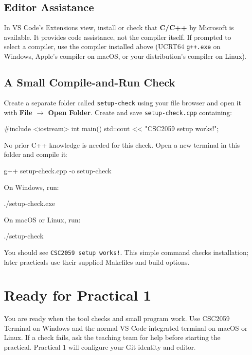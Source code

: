 \documentclass{csc2059practical}
\begin{document}
\subsection{Editor Assistance}
In VS Code's Extensions view, install or check that \textbf{C/C++} by Microsoft is available. It provides code assistance, not the compiler itself. If prompted to select a compiler, use the compiler installed above (UCRT64 \texttt{g++.exe} on Windows, Apple's compiler on macOS, or your distribution's compiler on Linux).

\subsection{A Small Compile-and-Run Check}
Create a separate folder called \texttt{setup-check} using your file browser and open it with \textbf{File $\rightarrow$ Open Folder}. Create and save \texttt{setup-check.cpp} containing:
\begin{cppcode}
#include <iostream>
int main()
{
    std::cout << "CSC2059 setup works!\n";
}
\end{cppcode}
No prior C++ knowledge is needed for this check. Open a new terminal in this folder and compile it:
\begin{bashcode}
g++ setup-check.cpp -o setup-check
\end{bashcode}
On Windows, run:
\begin{bashcode}
./setup-check.exe
\end{bashcode}
On macOS or Linux, run:
\begin{bashcode}
./setup-check
\end{bashcode}
You should see \texttt{CSC2059 setup works!}. This simple command checks installation; later practicals use their supplied Makefiles and build options.

\section{Ready for Practical 1}
You are ready when the tool checks and small program work. Use CSC2059 Terminal on Windows and the normal VS Code integrated terminal on macOS or Linux. If a check fails, ask the teaching team for help before starting the practical. Practical 1 will configure your Git identity and editor.
\end{document}
